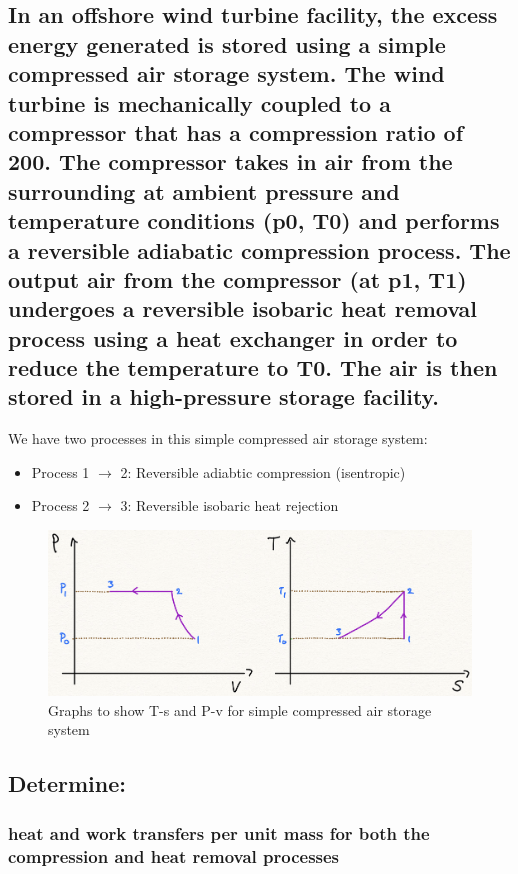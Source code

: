 \documentclass[12pt]{article}
\numberwithin{equation}{section}
\begin{document}
\begin{flushleft}
\subsection{In an offshore wind turbine facility, the excess energy generated is stored using a simple compressed air storage system. The wind turbine is mechanically coupled to a compressor that has a compression ratio of 200. The compressor takes in air from the surrounding at ambient pressure and temperature conditions (p0, T0) and performs a reversible adiabatic compression process. The output air from the compressor (at p1, T1) undergoes a reversible isobaric heat removal process using a heat exchanger in order to reduce the temperature to T0. The air is then stored in a high-pressure storage facility.}
We have two processes in this simple compressed air storage system:
\begin{itemize}
  \item Process 1 $\rightarrow$ 2: Reversible adiabtic compression (isentropic)
  \item Process 2 $\rightarrow$ 3: Reversible isobaric heat rejection
\end{itemize}

\begin{figure}[H]
  \centering
  \includegraphics[width  = \textwidth]{./img/TsPvDiagrams62.png}
  \caption{Graphs to show T-s and P-v for simple compressed air storage system}
\end{figure}

\subsection{Determine:}
\subsubsection{heat and work transfers per unit mass for both the compression and heat removal processes}

\end{flushleft}
\end{document}
